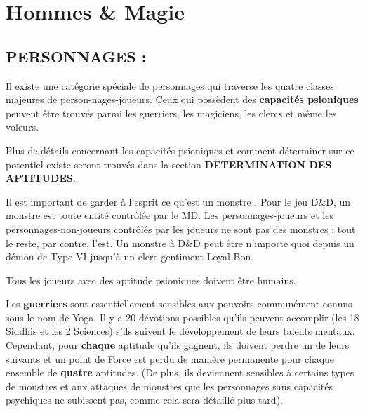 \documentclass[11pt]{article}
\begin{document}
\newpage

\section*{Hommes \& Magie}

\subsection*{\normalsize PERSONNAGES :}

{\parindent0pt

Il existe une catégorie spéciale de personnages qui traverse les quatre classes majeures de person-nages-joueurs. Ceux qui possèdent des \textbf{capacités psioniques} peuvent être trouvés parmi les guerriers, les magiciens, les clercs et même les voleurs.

\bigskip

Plus de détails concernant les capacités psioniques et comment déterminer sur ce potentiel existe seront trouvés dans la section \textbf{DETERMINATION DES APTITUDES}.

\bigskip

Il est important de garder à l'esprit ce qu'est un \og monstre \fg{}. Pour le jeu D\&D, un monstre est toute entité contrôlée par le MD. Les personnages-joueurs et les personnages-non-joueurs contrôlés par les joueurs ne sont pas des monstres : tout le reste, par contre, l'est. Un monstre à D\&D peut être n'importe quoi depuis un démon de Type VI jusqu'à un clerc gentiment Loyal Bon.

\bigskip

Tous les joueurs avec des aptitude psioniques doivent être humains.

\bigskip

Les \textbf{guerriers} sont essentiellement sensibles aux pouvoirs communément connus sous le nom de Yoga. Il y a 20 \og dévotions \fg{} possibles qu'ils peuvent accomplir (les 18 Siddhis et les 2 Sciences) s'ils suivent le développement de leurs talents mentaux. Cependant, pour \textbf{chaque} aptitude qu'ils gagnent, ils doivent perdre un de leurs suivants et un point de Force est perdu de manière permanente pour chaque ensemble de \textbf{quatre} aptitudes. (De plus, ils deviennent sensibles à certains types de monstres et aux attaques de monstres que les personnages sans capacités psychiques ne subissent pas, comme cela sera détaillé plus tard).

}
\end{document}
